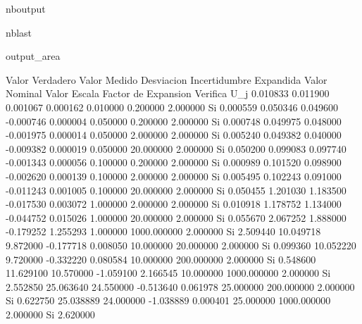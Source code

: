 \documentclass[letterpaper,10pt,english]{sphinxmanual}
\begin{document}
\begin{sphinxuseclass}{nboutput}
\begin{sphinxuseclass}{nblast}
{\begin{sphinxuseclass}{output_area}
\begin{sphinxuseclass}{}
\begin{sphinxVerbatim}[commandchars=\\\{\}]
Valor Verdadero      Valor Medido         Desviacion           Incertidumbre Expandida   Valor Nominal        Valor Escala         Factor de Expansion  Verifica        U\_j
0.010833             0.011900             0.001067             0.000162                  0.010000             0.200000             2.000000             Si              0.000559
0.050346             0.049600             -0.000746            0.000004                  0.050000             0.200000             2.000000             Si              0.000748
0.049975             0.048000             -0.001975            0.000014                  0.050000             2.000000             2.000000             Si              0.005240
0.049382             0.040000             -0.009382            0.000019                  0.050000             20.000000            2.000000             Si              0.050200
0.099083             0.097740             -0.001343            0.000056                  0.100000             0.200000             2.000000             Si              0.000989
0.101520             0.098900             -0.002620            0.000139                  0.100000             2.000000             2.000000             Si              0.005495
0.102243             0.091000             -0.011243            0.001005                  0.100000             20.000000            2.000000             Si              0.050455
1.201030             1.183500             -0.017530            0.003072                  1.000000             2.000000             2.000000             Si              0.010918
1.178752             1.134000             -0.044752            0.015026                  1.000000             20.000000            2.000000             Si              0.055670
2.067252             1.888000             -0.179252            1.255293                  1.000000             1000.000000          2.000000             Si              2.509440
10.049718            9.872000             -0.177718            0.008050                  10.000000            20.000000            2.000000             Si              0.099360
10.052220            9.720000             -0.332220            0.080584                  10.000000            200.000000           2.000000             Si              0.548600
11.629100            10.570000            -1.059100            2.166545                  10.000000            1000.000000          2.000000             Si              2.552850
25.063640            24.550000            -0.513640            0.061978                  25.000000            200.000000           2.000000             Si              0.622750
25.038889            24.000000            -1.038889            0.000401                  25.000000            1000.000000          2.000000             Si              2.620000


\end{sphinxVerbatim}
\end{sphinxuseclass}
\end{sphinxuseclass}}
\end{sphinxuseclass}
\end{sphinxuseclass}
\end{document}

